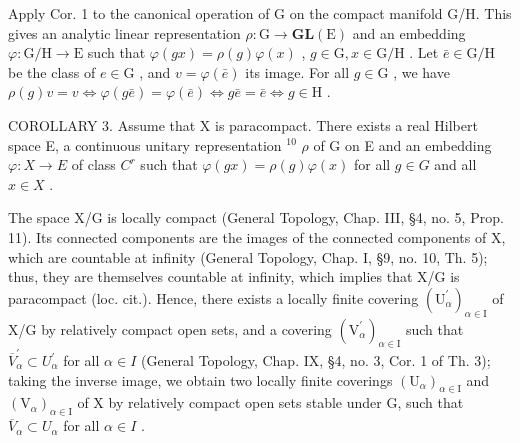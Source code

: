 Apply Cor. 1 to the canonical operation of G on the compact manifold G/H. This gives an analytic linear representation \(\rho: \mathrm{G} \to \mathbf{GL}(\mathrm{E})\) and an embedding \(\varphi: \mathrm{G} / \mathrm{H} \to \mathrm{E}\) such that \(\varphi(gx) = \rho(g)\varphi(x)\) , \(g \in \mathrm{G}, x \in \mathrm{G} / \mathrm{H}\) . Let \(\bar{e} \in \mathrm{G} / \mathrm{H}\) be the class of \(e \in \mathrm{G}\) , and \(v = \varphi(\bar{e})\) its image. For all \(g \in \mathrm{G}\) , we have \(\rho(g)v = v \Longleftrightarrow \varphi(g\bar{e}) = \varphi(\bar{e}) \Longleftrightarrow g\bar{e} = \bar{e} \Longleftrightarrow g \in \mathrm{H}\) .

COROLLARY 3. Assume that X is paracompact. There exists a real Hilbert space E, a continuous unitary representation \({}^{10}\) \(\rho\) of G on E and an embedding \(\varphi: X \to E\) of class \(C^{r}\) such that \(\varphi(gx) = \rho(g)\varphi(x)\) for all \(g \in G\) and all \(x \in X\) .

The space X/G is locally compact (General Topology, Chap. III, §4, no. 5, Prop. 11). Its connected components are the images of the connected components of X, which are countable at infinity (General Topology, Chap. I, §9, no. 10, Th. 5); thus, they are themselves countable at infinity, which implies that X/G is paracompact (loc. cit.). Hence, there exists a locally finite covering \((\mathrm{U}_{\alpha}^{\prime})_{\alpha\in\mathrm{I}}\) of X/G by relatively compact open sets, and a covering \((\mathrm{V}_{\alpha}^{\prime})_{\alpha\in\mathrm{I}}\) such that \(\overline{V}_{\alpha}^{\prime}\subset U_{\alpha}^{\prime}\) for all \(\alpha\in I\) (General Topology, Chap. IX, §4, no. 3, Cor. 1 of Th. 3); taking the inverse image, we obtain two locally finite coverings \((\mathrm{U}_{\alpha})_{\alpha\in\mathrm{I}}\) and \((\mathrm{V}_{\alpha})_{\alpha\in\mathrm{I}}\) of X by relatively compact open sets stable under G, such that \(\overline{V}_{\alpha}\subset U_{\alpha}\) for all \(\alpha\in I\) .

